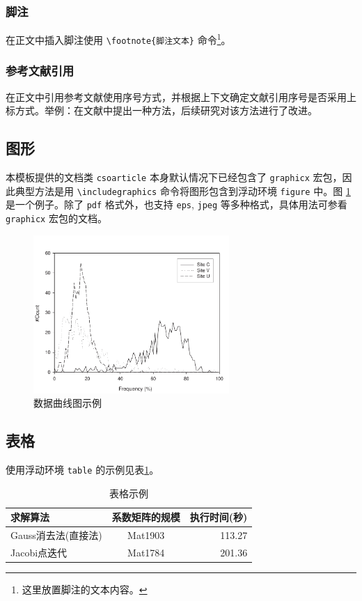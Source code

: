\documentclass[UTF8]{csoarticle}
\begin{document}
\subsubsection{脚注}

在正文中插入脚注使用 \verb|\footnote{脚注文本}| 命令\footnote{这里放置脚注的文本内容。}。

\subsubsection{参考文献引用}

在正文中引用参考文献使用序号方式，并根据上下文确定文献引用序号是否采用上标方式。举例：在文献\cite{bib1}中提出一种方法，后续研究对该方法进行了改进。

\subsection{图形}

本模板提供的文档类 \verb|csoarticle| 本身默认情况下已经包含了 \verb|graphicx| 宏包，因此典型方法是用 \verb|\includegraphics| 命令将图形包含到浮动环境 \verb|figure| 中。图 \ref{fig:sample} 是一个例子。除了 \verb|pdf| 格式外，也支持 \verb|eps|, \verb|jpeg| 等多种格式，具体用法可参看 \verb|graphicx| 宏包的文档。
\begin{figure}
\includegraphics[height=6cm]{figsamp}
\caption{数据曲线图示例}
\label{fig:sample}
\end{figure}

\subsection{表格}

使用浮动环境 \verb|table| 的示例见表\ref{tab:sample}。
\begin{table}
  \caption{表格示例}
  \label{tab:sample}
  \centering
  \begin{tabular}{lcr}%
    \hline
    求解算法                & 系数矩阵的规模    & 执行时间(秒)  \\
    \hline
    Gauss消去法(直接法)     & Mat1903           &  113.27       \\
    Jacobi点迭代            & Mat1784           &  201.36       \\
    \hline
  \end{tabular}
\end{table}
\end{document}
